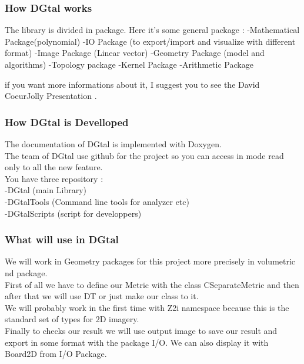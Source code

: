 \documentclass[a4paper,11pt]{report}
\begin{document}
\subsubsection{How DGtal works}
The library is divided in package.
Here it's some general package :
	-Mathematical Package(polynomial)
	-IO Package (to export/import and visualize with different format)
	-Image Package (Linear vector)
	-Geometry Package (model and algorithms)
	-Topology package
	-Kernel Package
	-Arithmetic Package

if you want more informations about it, I suggest you to see the David CoeurJolly Presentation \cite{davidcoeurjollypresentation}.

\subsubsection{How DGtal is Develloped}
The documentation of DGtal is implemented with Doxygen. \\
The team of DGtal use github for the project so you can access in mode read only to all the new feature. \\
You have three repository : \\
	-DGtal (main Library) \\
	-DGtalTools (Command line tools for analyzer etc) \\
	-DGtalScripts (script for developpers)

\subsubsection{What will use in DGtal}
We will work in Geometry packages for this project more precisely in volumetric nd package. \\
First of all we have to define our Metric with the class CSeparateMetric and then after that we will use DT or just make our class to it. \\
We will probably work in the first time with Z2i namespace because this is the standard set of types for 2D imagery. \\

Finally to checks our result we will use output image to save our result and export in some format with the package I/O. We can also display it with Board2D from I/O Package. \\
\end{document}
